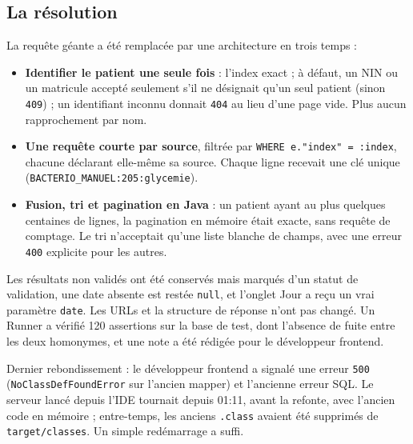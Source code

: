 \documentclass[10pt,twoside,openany]{article}
\begin{document}
\subsection*{La résolution}
La requête géante a été remplacée par une architecture en trois temps :
\begin{itemize}
  \item \textbf{Identifier le patient une seule fois} : l'index exact ; à défaut, un NIN ou un matricule accepté seulement s'il ne désignait qu'un seul patient (sinon \texttt{409}) ; un identifiant inconnu donnait \texttt{404} au lieu d'une page vide. Plus aucun rapprochement par nom.
  \item \textbf{Une requête courte par source}, filtrée par \texttt{WHERE e."index" = :index}, chacune déclarant elle-même sa source. Chaque ligne recevait une clé unique (\texttt{BACTERIO\_MANUEL:205:glycemie}).
  \item \textbf{Fusion, tri et pagination en Java} : un patient ayant au plus quelques centaines de lignes, la pagination en mémoire était exacte, sans requête de comptage. Le tri n'acceptait qu'une liste blanche de champs, avec une erreur \texttt{400} explicite pour les autres.
\end{itemize}

Les résultats non validés ont été conservés mais marqués d'un statut de validation, une date absente est restée \texttt{null}, et l'onglet Jour a reçu un vrai paramètre \texttt{date}. Les URLs et la structure de réponse n'ont pas changé. Un Runner a vérifié 120 assertions sur la base de test, dont l'absence de fuite entre les deux homonymes, et une note a été rédigée pour le développeur frontend.

Dernier rebondissement : le développeur frontend a signalé une erreur \texttt{500} (\texttt{NoClassDefFoundError} sur l'ancien mapper) et l'ancienne erreur SQL. Le serveur lancé depuis l'IDE tournait depuis 01:11, avant la refonte, avec l'ancien code en mémoire ; entre-temps, les anciens \texttt{.class} avaient été supprimés de \texttt{target/classes}. Un simple redémarrage a suffi.
\end{document}
